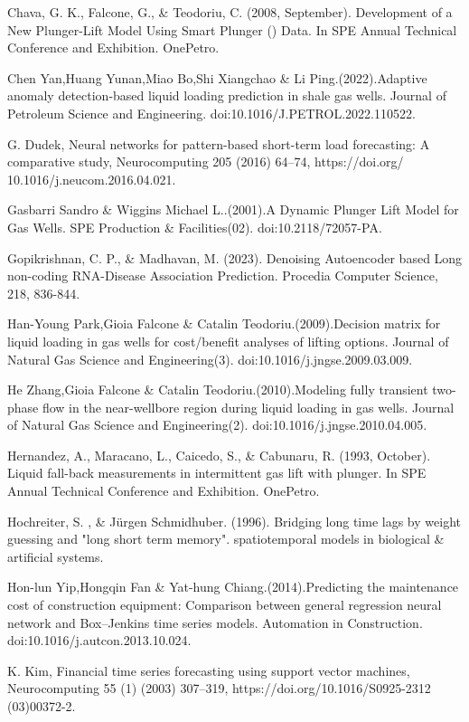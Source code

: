 \documentclass[sn-mathphys,Numbered]{sn-jnl}%
\theoremstyle{thmstyleone}%
\theoremstyle{thmstyletwo}%
\theoremstyle{thmstylethree}%
\begin{document}
Chava, G. K., Falcone, G., \& Teodoriu, C. (2008, September). Development of a New Plunger-Lift Model Using Smart Plunger () Data. In SPE Annual Technical Conference and Exhibition. OnePetro.

Chen Yan,Huang Yunan,Miao Bo,Shi Xiangchao \& Li Ping.(2022).Adaptive anomaly detection-based liquid loading prediction in shale gas wells. Journal of Petroleum Science and Engineering. doi:10.1016/J.PETROL.2022.110522. 

G. Dudek, Neural networks for pattern-based short-term load forecasting: A comparative study, Neurocomputing 205 (2016) 64–74, https://doi.org/ 10.1016/j.neucom.2016.04.021.

Gasbarri Sandro \& Wiggins Michael L..(2001).A Dynamic Plunger Lift Model for Gas Wells. SPE Production \& Facilities(02). doi:10.2118/72057-PA.

Gopikrishnan, C. P., \& Madhavan, M. (2023). Denoising Autoencoder based Long non-coding RNA-Disease Association Prediction. Procedia Computer Science, 218, 836-844.

Han-Young Park,Gioia Falcone \& Catalin Teodoriu.(2009).Decision matrix for liquid loading in gas wells for cost/benefit analyses of lifting options. Journal of Natural Gas Science and Engineering(3). doi:10.1016/j.jngse.2009.03.009.

He Zhang,Gioia Falcone \& Catalin Teodoriu.(2010).Modeling fully transient two-phase flow in the near-wellbore region during liquid loading in gas wells. Journal of Natural Gas Science and Engineering(2). doi:10.1016/j.jngse.2010.04.005.

Hernandez, A., Maracano, L., Caicedo, S., \& Cabunaru, R. (1993, October). Liquid fall-back measurements in intermittent gas lift with plunger. In SPE Annual Technical Conference and Exhibition. OnePetro.

Hochreiter, S. , \& Jürgen Schmidhuber. (1996). Bridging long time lags by weight guessing and "long short term memory". spatiotemporal models in biological \& artificial systems.

Hon-lun Yip,Hongqin Fan \& Yat-hung Chiang.(2014).Predicting the maintenance cost of construction equipment: Comparison between general regression neural network and Box–Jenkins time series models. Automation in Construction. doi:10.1016/j.autcon.2013.10.024.

K. Kim, Financial time series forecasting using support vector machines, Neurocomputing 55 (1) (2003) 307–319, https://doi.org/10.1016/S0925-2312 (03)00372-2.
\end{document}
